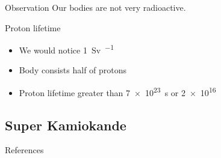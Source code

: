 \documentclass[english, fleqn]{beamer}
\begin{document}
\begin{frame}
    \begin{block}{Observation}
        Our bodies are not very radioactive.
    \end{block}

    \pause

    \begin{block}{Proton lifetime}
        \begin{itemize}
            \item We would notice \SI{1}{\sievert\per\year}
            \item Body consists half of protons
            \item Proton lifetime greater than \SI{7e23}{\second} or \SI{2e16}{\year}
        \end{itemize}
    \end{block}

    \nocite{wikipedia/groessenordnung-aequivalentdosis}
\end{frame}

\subsection{Super Kamiokande}

\begin{frame}
    References

    \printbibliography
\end{frame}
\end{document}
